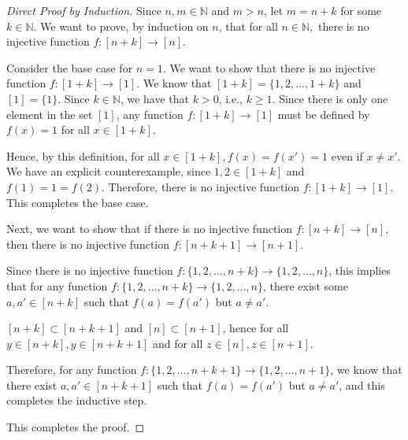 \documentclass[11pt]{article}
\newcommand{\bbN}{\mathbb{N}}
\theoremstyle{definition}
\numberwithin{equation}{subsection}
\begin{document}
\begin{proof}[Direct Proof by Induction]
Since $n, m \in \bbN$ and $m>n$, let $m=n+k$ for some $k \in \bbN$. We want to prove, by induction on $n$, that for all $n\in\mathbb{N},$ there is no injective function $f:[n+k]\rightarrow [n].$

Consider the base case for $n=1$. We want to show that there is no injective function $f:[1+k]\rightarrow [1].$ We know that $[1+k] = \{1, 2, \dots, 1+k\}$ and $[1] = \{1\}$. Since $k \in \bbN$, we have that $k>0$, i.e., $k \geq 1$. Since there is only one element in the set $[1]$, any function $f\colon [1+k] \rightarrow [1]$ must be defined by $f(x)=1$ for all $x \in [1+k]$. 

Hence, by this definition, for all $x \in [1+k], f(x)=f(x')=1$ even if $x \not = x'$. We have an explicit counterexample, since $1,2 \in [1+k]$ and $f(1)=1=f(2)$. Therefore, there is no injective function $f:[1+k]\rightarrow [1].$ This completes the base case.

Next, we want to show that if there is no injective function $f:[n+k]\rightarrow [n]$, then there is no injective function $f:[n+k+1]\rightarrow [n+1].$ 

Since there is no injective function $f:\{1, 2, \dots, n+k\}\rightarrow \{1, 2, \dots, n\}$, this implies that for any function $f:\{1, 2, \dots, n+k\}\rightarrow \{1, 2, \dots, n\}$, there exist some $a, a' \in [n+k]$ such that $f(a)=f(a')$ but $a \not = a'$.

$[n+k] \subset [n+k+1]$ and $[n] \subset [n+1]$, hence for all $y \in [n+k], y \in [n+k+1]$ and for all $z \in [n], z \in [n+1]$.

Therefore, for any function $f:\{1, 2, \dots, n+k+1\}\rightarrow \{1, 2, \dots, n+1\}$, we know that there exist $a, a' \in [n+k+1]$ such that $f(a)=f(a')$ but $a \not = a'$, and this completes the inductive step.

This completes the proof.

\renewcommand\qedsymbol{QED}

\end{proof}
\end{document}
